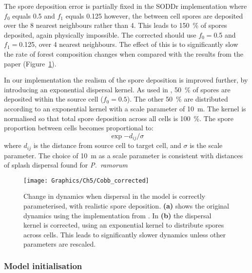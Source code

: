 The spore deposition error is partially fixed in the SODDr implementation where $f_0$ equals 0.5 and $f_1$ equals \num{0.125} however, the between cell spores are deposited over the 8 nearest neighbours rather than 4. This leads to \SI{150}{\percent} of spores deposited, again physically impossible. The corrected should use $f_0=$\num{0.5} and $f_1=$\num{0.125}, over 4 nearest neighbours. The effect of this is to significantly slow the rate of forest composition changes when compared with the results from the paper (Figure~\ref{fig:ch5:cobb_spatial_rate}).

In our implementation the realism of the spore deposition is improved further, by introducing an exponential dispersal kernel. As used in \citet{cobb_ecosystem_2012}, \SI{50}{\percent} of spores are deposited within the source cell ($f_0=\num{0.5}$). The other \SI{50}{\percent} are distributed according to an exponential kernel with a scale parameter of \SI{10}{\meter}. The kernel is normalised so that total spore deposition across all cells is \SI{100}{\percent}. The spore proportion between cells becomes proportional to:
\begin{equation}\label{eqn:ch5:spore_kernel}
    \exp{-d_{ij}/\sigma}
\end{equation}
where $d_{ij}$ is the distance from source cell to target cell, and $\sigma$ is the scale parameter. The choice of \SI{10}{\meter} as a scale parameter is consistent with distances of splash dispersal found for \emph{P.~ramorum} \citep{davidson_transmission_2005}

\begin{figure}[t]
    \begin{center}
        \texttt{[image: Graphics/Ch5/Cobb\_corrected]}
        \caption[Change in model dynamics under corrected parameters]{Change in dynamics when dispersal in the model is correctly parameterised, with realistic spore deposition. \textbf{(a)} shows the original dynamics using the implementation from \citet{cobb_ecosystem_2012}. In \textbf{(b)} the dispersal kernel is corrected, using an exponential kernel to distribute spores across cells. This leads to significantly slower dynamics unless other parameters are rescaled.\label{fig:ch5:cobb_spatial_rate}}
    \end{center}
\end{figure}

\subsubsection{Model initialisation}

